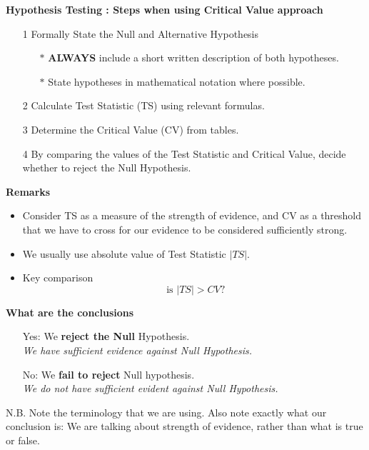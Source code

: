 \documentclass[a4paper,12pt]{article}
\begin{document}
\begin{framed}
\noindent \textbf{Hypothesis Testing : Steps when using Critical Value approach}

\begin{itemize}
	\item[1] Formally State the Null and Alternative Hypothesis \smallskip
	{
		\begin{itemize}
			\item[$\ast$] \textbf{ALWAYS} include a short written description of both hypotheses.
			\item[$\ast$] State hypotheses in mathematical notation where possible.
			
		\end{itemize}
	}
	\item[2] Calculate Test Statistic (TS) using relevant formulas.\smallskip
	\item[3] Determine the Critical Value (CV) from tables. \smallskip
	\item[4] By comparing the values of the Test Statistic and Critical Value, decide whether to reject the Null Hypothesis.
\end{itemize}
\end{framed}

\noindent \textbf{Remarks}
\begin{itemize} 
	\item Consider TS as a measure of the strength of evidence, and CV as a threshold that we have to cross for our evidence to be considered sufficiently strong.
	\item We usually use absolute value of Test Statistic $|TS|$.
	\item Key comparison
	\[ \mbox{ is } |TS| > CV \mbox{?} \]
\end{itemize}	


\noindent \textbf{What are the conclusions}
\begin{itemize} 
	
	\item[Yes:] We \textbf{reject the Null} Hypothesis. \\ \textit{We have sufficient evidence against Null Hypothesis.}
	
	\item[No:] We \textbf{fail to reject} Null hypothesis. \\ \textit{We do not have sufficient evident against Null Hypothesis.}
\end{itemize}	
{	\normalsize
	N.B. Note the terminology that we are using. Also note exactly what our conclusion is: We are talking about strength of evidence, rather than what is true or false.}
\end{document}
